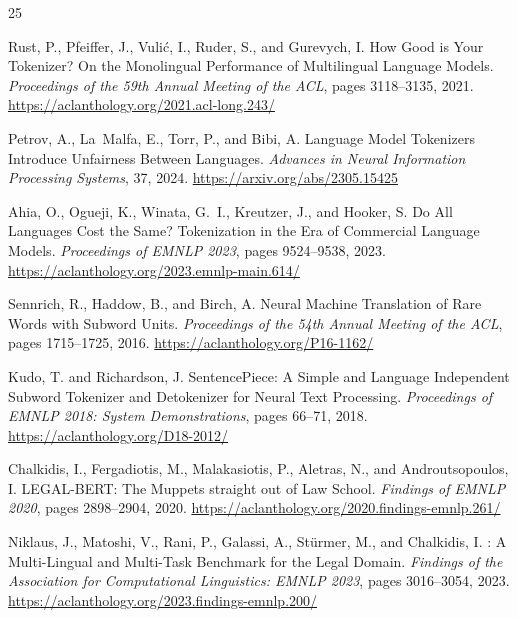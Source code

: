 \documentclass[11pt,a4paper]{article}
\begin{document}
\begin{thebibliography}{25}
\providecommand{\natexlab}[1]{#1}

Rust, P., Pfeiffer, J., Vuli\'{c}, I., Ruder, S., and Gurevych, I.
\newblock How Good is Your Tokenizer? On the Monolingual Performance of Multilingual Language Models.
\newblock \emph{Proceedings of the 59th Annual Meeting of the ACL}, pages 3118--3135, 2021.
\newblock \url{https://aclanthology.org/2021.acl-long.243/}

Petrov, A., La~Malfa, E., Torr, P., and Bibi, A.
\newblock Language Model Tokenizers Introduce Unfairness Between Languages.
\newblock \emph{Advances in Neural Information Processing Systems}, 37, 2024.
\newblock \url{https://arxiv.org/abs/2305.15425}

Ahia, O., Ogueji, K., Winata, G.~I., Kreutzer, J., and Hooker, S.
\newblock Do All Languages Cost the Same? Tokenization in the Era of Commercial Language Models.
\newblock \emph{Proceedings of EMNLP 2023}, pages 9524--9538, 2023.
\newblock \url{https://aclanthology.org/2023.emnlp-main.614/}

Sennrich, R., Haddow, B., and Birch, A.
\newblock Neural Machine Translation of Rare Words with Subword Units.
\newblock \emph{Proceedings of the 54th Annual Meeting of the ACL}, pages 1715--1725, 2016.
\newblock \url{https://aclanthology.org/P16-1162/}

Kudo, T. and Richardson, J.
\newblock SentencePiece: A Simple and Language Independent Subword Tokenizer and Detokenizer for Neural Text Processing.
\newblock \emph{Proceedings of EMNLP 2018: System Demonstrations}, pages 66--71, 2018.
\newblock \url{https://aclanthology.org/D18-2012/}

Chalkidis, I., Fergadiotis, M., Malakasiotis, P., Aletras, N., and Androutsopoulos, I.
\newblock LEGAL-BERT: The Muppets straight out of Law School.
\newblock \emph{Findings of EMNLP 2020}, pages 2898--2904, 2020.
\newblock \url{https://aclanthology.org/2020.findings-emnlp.261/}

Niklaus, J., Matoshi, V., Rani, P., Galassi, A., St{\"u}rmer, M., and Chalkidis, I.
: A Multi-Lingual and Multi-Task Benchmark for the Legal Domain.
\newblock \emph{Findings of the Association for Computational Linguistics: EMNLP 2023}, pages 3016--3054, 2023.
\newblock \url{https://aclanthology.org/2023.findings-emnlp.200/}


\end{thebibliography}
\end{document}

